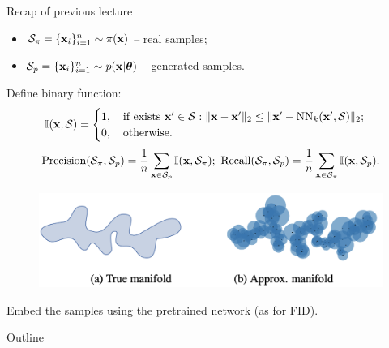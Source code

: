 \begin{frame}{Recap of previous lecture}
	\vspace{-0.2cm}
	\begin{itemize}
		\item $\mathcal{S}_{\pi} = \{\mathbf{x}_i\}_{i=1}^{n} \sim \pi(\mathbf{x})$ -- real samples;
		\item $\mathcal{S}_{p} = \{\mathbf{x}_i\}_{i=1}^{n} \sim p(\mathbf{x} | \boldsymbol{\theta})$ -- generated samples.
	\end{itemize}
	Define binary function:
	\vspace{-0.2cm}
	\[
		\mathbb{I}(\mathbf{x}, \mathcal{S}) = 
		\begin{cases}
			1, \quad \text{if exists } \mathbf{x}' \in \mathcal{S}: \| \mathbf{x}  - \mathbf{x}'\|_2 \leq \| \mathbf{x}' - \text{NN}_k(\mathbf{x}', \mathcal{S})\|_2; \\
			0, \quad \text{otherwise.}
		\end{cases}
	\]
	\vspace{-0.3cm}
	\[
		\text{Precision} (\mathcal{S}_{\pi}, \mathcal{S}_{p}) = \frac{1}{n} \sum_{\mathbf{\mathbf{x}} \in \mathcal{S}_{p}} \mathbb{I}(\mathbf{x}, \mathcal{S}_{\pi}); \,\, \text{Recall} (\mathcal{S}_{\pi}, \mathcal{S}_{p}) = \frac{1}{n} \sum_{\mathbf{x} \in \mathcal{S}_{\pi}} \mathbb{I}(\mathbf{x}, \mathcal{S}_{p}).
	\]
	\vspace{-0.6cm}
	\begin{figure}
		\includegraphics[width=0.75\linewidth]{figs/pr_k_nearest}
	\end{figure}
	Embed the samples using the pretrained network (as for FID).
\end{frame}
\begin{frame}{Outline}
	\tableofcontents
\end{frame}

